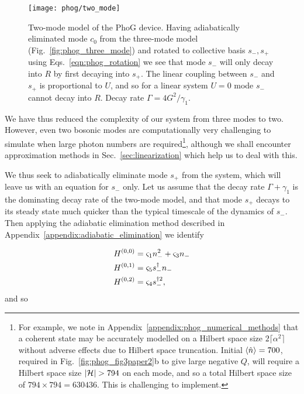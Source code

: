 \begin{figure}[htp]
\captionsetup{width=0.8\linewidth}
\centering
\texttt{[image: phog/two\_mode]}
\caption{\label{fig:phog_two_mode_model} Two-mode model of the PhoG device. Having adiabatically eliminated mode $c_0$ from the three-mode model (Fig.~\ref{fig:phog_three_mode}) and rotated to collective basis $s_-, s_+$ using Eqs.~\ref{eqn:phog_rotation} we see that mode $s_-$ will only decay into $R$ by first decaying into $s_+$. The linear coupling between $s_-$ and $s_+$ is proportional to $U$, and so for a linear system $U=0$ mode $s_-$ cannot decay into $R$. Decay rate $\Gamma = 4 G^2 / \gamma_1$.}
\end{figure}


We have thus reduced the complexity of our system from three modes to two. However, even two bosonic modes are computationally very challenging to simulate when large photon numbers are required\footnote{For example, we note in Appendix~\ref{appendix:phog_numerical_methods} that a coherent state may be accurately modelled on a Hilbert space size $2 \lceil \alpha^2 \rceil$ without adverse effects due to Hilbert space truncation. Initial $\ev{\hat{n}} = 700$, required in Fig.~\ref{fig:phog_fig3paper2}b to give large negative $Q$, will require a Hilbert space size $\left|\mathcal{H}\right| > 794$ on each mode, and so a total Hilbert space size of $794 \times 794 = 630436$. This is challenging to implement.}, although we shall encounter approximation methods in Sec.~\ref{sec:linearization} which help us to deal with this. 

We thus seek to adiabatically eliminate mode $s_+$ from the system, which will leave us with an equation for $s_-$ only. Let us assume that the decay rate $\Gamma + \gamma_1$ is the dominating decay rate of the two-mode model, and that mode $s_+$ decays to its steady state much quicker than the typical timescale of the dynamics of $s_-$. Then applying the adiabatic elimination method described in Appendix~\ref{appendix:adiabatic_elimination} we identify

\begin{align}\label{eqn:phog_single_mode_deriv_adiabatic}
H^{\left(0, 0\right)} &= \varsigma_1 n_-^2 + \varsigma_3 n_- \notag \\ 
%
H^{\left(0, 1\right)} &= \varsigma_5 s_-^\dagger n_- \notag \\
%
H^{\left(0, 2\right)} &= \varsigma_4 s_-^{\dagger 2},
\end{align}
and so


